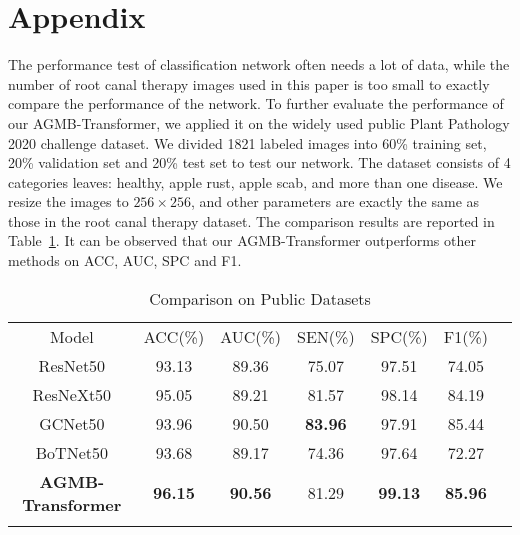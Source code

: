 \documentclass[journal]{IEEEtran}
\begin{document}
\section*{Appendix}
The performance test of classification network often needs a lot of data, while the number of root canal therapy images used in this paper is too small to exactly compare the performance of the network. To further evaluate the performance of our AGMB-Transformer, we applied it on the widely used public Plant Pathology 2020 challenge dataset\cite{thapa2020plant}. We divided 1821 labeled images into 60\% training set, 20\% validation set and 20\% test set to test our network. The dataset consists of 4 categories leaves: healthy, apple rust, apple scab, and more than one disease. We resize the images to $256 \times 256$, and other parameters are exactly the same as those in the root canal therapy dataset. The comparison results are reported in \textcolor[rgb]{0,0.541,0.855}{Table~\ref{tabpubdata}}. It can be observed that our AGMB-Transformer outperforms other methods on ACC, AUC, SPC and F1. 


\begin{table}[ht]
\centering
\renewcommand\arraystretch{1.2}
\setlength{\tabcolsep}{1.0mm}
\caption{Comparison on Public Datasets}
\begin{tabular}{c|cccccc}
\Xhline{1pt}
Model    & ACC(\%)&AUC(\%) & SEN(\%) & SPC(\%) & F1(\%)   \\ \cline{1-6}

ResNet50  & 93.13  & 89.36 & 75.07  & 97.51 & 74.05  \\ \cline{1-6}
ResNeXt50  & 95.05  &89.21   & 81.57  & 98.14  &84.19  \\ \cline{1-6}
GCNet50 & 93.96  & 90.50 &  \textbf{83.96}  & 97.91  & 85.44  \\ \cline{1-6}
BoTNet50  & 93.68  & 89.17  & 74.36  & 97.64  & 72.27  \\ \cline{1-6}

\textbf{AGMB-Transformer}   & \textbf{96.15 } & \textbf{90.56}     & 81.29    & \textbf{99.13 } & \textbf{85.96}  \\ \Xhline{1pt}
\end{tabular}
\label{tabpubdata}
\end{table}





\end{document}
